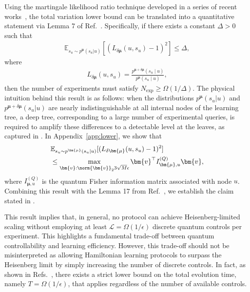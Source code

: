 \documentclass[twocolumn,superscriptaddress,aps,showpacs,amsmath,amstex,amssymb,citeautoscript,floatfix,pra,preprintnumbers]{revtex4-2}
\theoremstyle{plain}
\theoremstyle{plain}
\theoremstyle{plain}
\theoremstyle{plain}
\theoremstyle{plain}
\theoremstyle{plain}
\newcommand{\eqs}[1]{\begin{equation}\begin{split}#1\end{split}\end{equation}}
\begin{document}
 
Using the martingale likelihood ratio technique developed in a series of recent works~\cite{ComplexityNISQ,2023arXiv230914326C,2021arXiv211207646C}, the total variation lower bound can be translated into a quantitative statement via Lemma 7 of Ref.~\cite{OptimalTradeOff}. Specifically, if there exists a constant $\Delta > 0$ such that
\begin{align}\label{eq:martingale}
\mathbb{E}_{s_u\sim p^{\bm{\mu}}(s_u|u)}[(L_{\delta\bm{\mu}}(u,s_u)-1)^2]\leq\Delta,
\end{align}
where
\begin{align}
L_{\delta\bm{\mu}}(u, s_u) = \frac{p^{\bm{\mu} + \delta\bm{\mu}}(s_u \mid u)}{p^{\bm{\mu}}(s_u \mid u)},
\end{align}
then the number of experiments must satisfy $N_{\exp}\geq\Omega(1/\Delta)$. The physical intuition behind this result is as follows: when the distributions  $p^{\bm{\mu}}(s_u|u)$ and $p^{\bm{\mu}+\delta \bm{\mu}}(s_u|u)$ are nearly indistinguishable at all internal nodes of the learning tree, a deep tree, corresponding to a large number of experimental queries, is required to amplify these differences to a detectable level at the leaves, as captured in . In Appendix~\ref{app:lower}, we show that
\eqs{
&\mathbb{E}_{s_u\sim p^{\bm{\mu}}(s_u|u)}[(L_{\delta\bm{\mu}}(u,s_u)-1)^2] \\
&\leq \max_{\bm{v}:\norm{\bm{v}}_2 3\sqrt{M}\epsilon}\bm{v}^\top I^{(Q)}_{{\bm{\mu}},u}\bm{v},
}
where $I^{(Q)}_{{\bm{\mu}},u}$ is the quantum Fisher information matrix associated with node $u$. Combining this result with the Lemma 17 from Ref.~\cite{dutkiewicz2024advantage}, we establish the claim stated in .




This result implies that, in general, no protocol can achieve Heisenberg-limited scaling without employing at least $\mathcal{L} = \Omega(1/\epsilon)$ discrete quantum controls per experiment. This highlights a fundamental trade-off between quantum controllability and learning efficiency. However, this trade-off should not be misinterpreted as allowing Hamiltonian learning protocols to surpass the Heisenberg limit by simply increasing the number of discrete controls. In fact, as shown in Refs.~\cite{HuangTongFangSu2023learning,ma2024learningkbodyhamiltonianscompressed,dutkiewicz2024advantage}, there exists a strict lower bound on the total evolution time, namely $T = \Omega(1/\epsilon)$, that applies regardless of the number of available controls.
\end{document}
